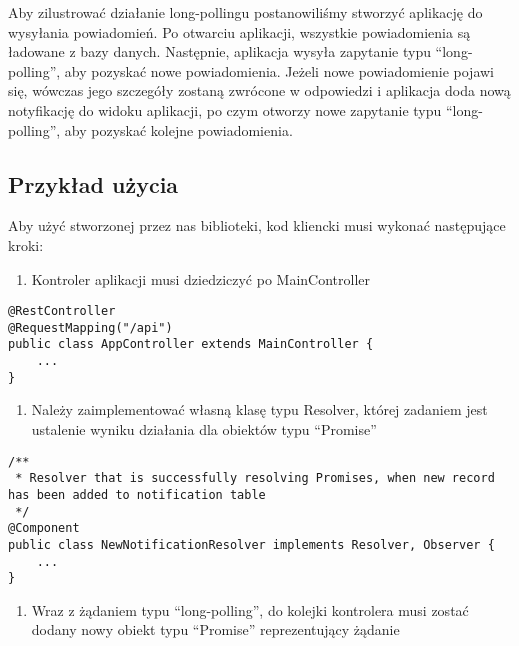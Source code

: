 \documentclass[]{article}
\providecommand{\tightlist}{%
  \setlength{\itemsep}{0pt}\setlength{\parskip}{0pt}}
\begin{document}
Aby zilustrować działanie long-pollingu postanowiliśmy stworzyć
aplikację do wysyłania powiadomień. Po otwarciu aplikacji, wszystkie
powiadomienia są ładowane z bazy danych. Następnie, aplikacja wysyła
zapytanie typu ``long-polling'', aby pozyskać nowe powiadomienia. Jeżeli
nowe powiadomienie pojawi się, wówczas jego szczegóły zostaną zwrócone w
odpowiedzi i aplikacja doda nową notyfikację do widoku aplikacji, po
czym otworzy nowe zapytanie typu ``long-polling'', aby pozyskać kolejne
powiadomienia.

\hypertarget{przykux142ad-uux17cycia}{%
\subsection{Przykład użycia}\label{przykux142ad-uux17cycia}}

Aby użyć stworzonej przez nas biblioteki, kod kliencki musi wykonać
następujące kroki:

\begin{enumerate}
\def\labelenumi{\arabic{enumi}.}
\tightlist
\item
  Kontroler aplikacji musi dziedziczyć po MainController
\end{enumerate}

\begin{verbatim}
@RestController
@RequestMapping("/api")
public class AppController extends MainController {
    ...
}
\end{verbatim}

\begin{enumerate}
\def\labelenumi{\arabic{enumi}.}
\setcounter{enumi}{1}
\tightlist
\item
  Należy zaimplementować własną klasę typu Resolver, której zadaniem
  jest ustalenie wyniku działania dla obiektów typu ``Promise''
\end{enumerate}

\begin{verbatim}
/**
 * Resolver that is successfully resolving Promises, when new record has been added to notification table
 */
@Component
public class NewNotificationResolver implements Resolver, Observer {
    ...
}
\end{verbatim}

\begin{enumerate}
\def\labelenumi{\arabic{enumi}.}
\setcounter{enumi}{2}
\tightlist
\item
  Wraz z żądaniem typu ``long-polling'', do kolejki kontrolera musi
  zostać dodany nowy obiekt typu ``Promise'' reprezentujący żądanie
\end{enumerate}
\end{document}
